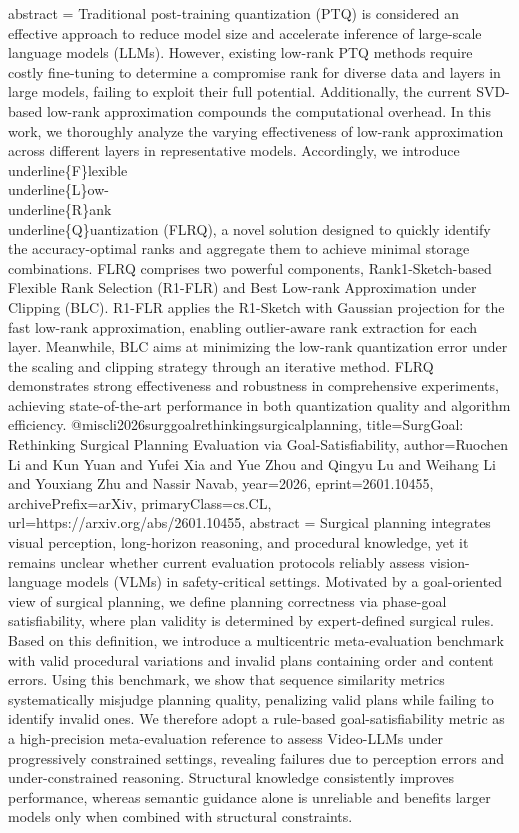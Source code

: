 {      abstract = {Traditional post-training quantization (PTQ) is considered an effective approach to reduce model size and accelerate inference of large-scale language models (LLMs). However, existing low-rank PTQ methods require costly fine-tuning to determine a compromise rank for diverse data and layers in large models, failing to exploit their full potential. Additionally, the current SVD-based low-rank approximation compounds the computational overhead. In this work, we thoroughly analyze the varying effectiveness of low-rank approximation across different layers in representative models. Accordingly, we introduce \\underline\{F\}lexible \\underline\{L\}ow-\\underline\{R\}ank \\underline\{Q\}uantization (FLRQ), a novel solution designed to quickly identify the accuracy-optimal ranks and aggregate them to achieve minimal storage combinations. FLRQ comprises two powerful components, Rank1-Sketch-based Flexible Rank Selection (R1-FLR) and Best Low-rank Approximation under Clipping (BLC). R1-FLR applies the R1-Sketch with Gaussian projection for the fast low-rank approximation, enabling outlier-aware rank extraction for each layer. Meanwhile, BLC aims at minimizing the low-rank quantization error under the scaling and clipping strategy through an iterative method. FLRQ demonstrates strong effectiveness and robustness in comprehensive experiments, achieving state-of-the-art performance in both quantization quality and algorithm efficiency.}
}@misc{li2026surggoalrethinkingsurgicalplanning,
      title={SurgGoal: Rethinking Surgical Planning Evaluation via Goal-Satisfiability}, 
      author={Ruochen Li and Kun Yuan and Yufei Xia and Yue Zhou and Qingyu Lu and Weihang Li and Youxiang Zhu and Nassir Navab},
      year={2026},
      eprint={2601.10455},
      archivePrefix={arXiv},
      primaryClass={cs.CL},
      url={https://arxiv.org/abs/2601.10455},
      abstract = {Surgical planning integrates visual perception, long-horizon reasoning, and procedural knowledge, yet it remains unclear whether current evaluation protocols reliably assess vision-language models (VLMs) in safety-critical settings. Motivated by a goal-oriented view of surgical planning, we define planning correctness via phase-goal satisfiability, where plan validity is determined by expert-defined surgical rules. Based on this definition, we introduce a multicentric meta-evaluation benchmark with valid procedural variations and invalid plans containing order and content errors. Using this benchmark, we show that sequence similarity metrics systematically misjudge planning quality, penalizing valid plans while failing to identify invalid ones. We therefore adopt a rule-based goal-satisfiability metric as a high-precision meta-evaluation reference to assess Video-LLMs under progressively constrained settings, revealing failures due to perception errors and under-constrained reasoning. Structural knowledge consistently improves performance, whereas semantic guidance alone is unreliable and benefits larger models only when combined with structural constraints.}
}
